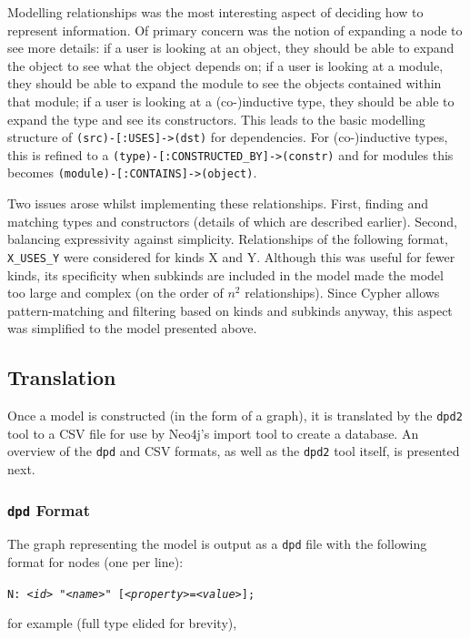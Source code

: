 Modelling relationships was the most interesting aspect of deciding how to
represent information. Of primary concern was the notion of expanding a node to
see more details: if a user is looking at an object, they should be able to
expand the object to see what the object depends on; if a user is looking at a
module, they should be able to expand the module to see the objects contained
within that module; if a user is looking at a (co-)inductive type, they should
be able to expand the type and see its constructors. This leads to the basic
modelling structure of \texttt{(src)-[:USES]->(dst)} for
dependencies. For (co-)inductive types, this is refined to a
\texttt{(type)-[:CONSTRUCTED_BY]->(constr)} and for modules this
becomes \texttt{(module)-[:CONTAINS]->(object)}.

Two issues arose whilst implementing these relationships. First, finding and
matching types and constructors (details of which are described earlier).
Second, balancing expressivity against simplicity. Relationships of the
following format, \texttt{X\_USES\_Y} were considered for kinds X and Y.
Although this was useful for fewer kinds, its specificity when subkinds are
included in the model made the model too large and complex (on the order of
$n^{2}$ relationships). Since Cypher allows pattern-matching and filtering
based on kinds and subkinds anyway, this aspect was simplified to the model
presented above.

\subsection{Translation}

Once a model is constructed (in the form of a graph), it is translated by the
\texttt{dpd2} tool to a CSV file for use by Neo4j's import tool to create a
database. An overview of the \texttt{dpd} and CSV formats, as well as the
\texttt{dpd2} tool itself, is presented next.

\subsubsection{\texttt{dpd} Format}

The graph representing the model is output as a \texttt{dpd} file with the
following format for nodes (one per line):

{\tt N: \emph{<id>} "\emph{<name>}" [\emph{<property>}=\emph{<value>}];}

for example (full type elided for brevity), 

